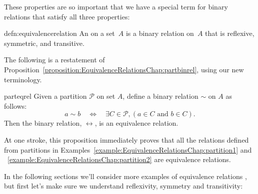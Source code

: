 These properties  are so important that we have a special term for binary relations that satisfy all three properties:

\begin{defn}{defn:equivalencerelation}
An  on a set~$A$ is a binary relation on~$A$ that is reflexive, symmetric, and transitive.
\end{defn}

The following is a restatement of Proposition~\ref{proposition:EquivalenceRelationsChap:partbinrel}, using our new terminology.

\begin{prop}{parteqrel} Given a partition $\mathcal{P}$ on set $A$, define a binary relation $\sim$ on $A$ as follows: 
\[a \sim b \quad \iff \quad \exists C \in \mathcal{P}, ( a \in C \text{ and } b \in C ).\]  
Then the binary relation, $\rel$, is an equivalence relation.
\end{prop}

At one stroke, this proposition immediately proves that all  the relations defined from partitions in Examples~\ref{example:EquivalenceRelationsChap:partition1} and ~\ref{example:EquivalenceRelationsChap:partition2} are equivalence relations.

In the following sections we'll consider more examples of equivalence relations , but first let's make sure we understand reflexivity, symmetry and transitivity:

